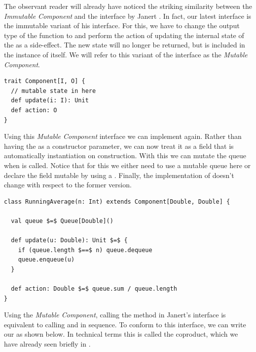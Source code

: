 The observant reader will already have noticed the striking similarity between the \textit{Immutable Component} and the  interface by Janert \cite{janert2013-feedback}. In fact, our latest \comp interface is the immutable variant of his interface. For this, we have to change the output type of the  function to  and perform the action of updating the internal state of the \comp as a side-effect. The new state will no longer be returned, but is included in the instance of \comp itself. We will refer to this variant of the interface as the \textit{Mutable Component}.

\begin{lstlisting}[style=InlineScalaStyle]
trait Component[I, O] {
  // mutable state in here
  def update(i: I): Unit
  def action: O
}
\end{lstlisting}

Using this \textit{Mutable Component} interface we can implement  again. Rather than having the  as a constructor parameter, we can now treat it as a field that is automatically instantiation on construction. With this we can mutate the queue when  is called. Notice that for this we either need to use a mutable queue here or declare the field mutable by using a . Finally, the implementation of  doesn't change with respect to the former version.

\begin{minipage}{\linewidth}
\begin{lstlisting}[style=ScalaStyle, caption={Implementation of \code{RunningAverage} using the \textit{Mutable Component} interface}, label={lst:mutable-runningaverage}]
class RunningAverage(n: Int) extends Component[Double, Double] {

  val queue $=$ Queue[Double]()

  def update(u: Double): Unit $=$ {
    if (queue.length $==$ n) queue.dequeue
    queue.enqueue(u)
  }

  def action: Double $=$ queue.sum / queue.length
}
\end{lstlisting}
\end{minipage}

Using the \textit{Mutable Component}, calling the  method in Janert's \comp interface is equivalent to calling  and  in sequence. To conform to this interface, we can write our \comp as shown below. In technical terms this is called the coproduct, which we have already seen briefly in .


